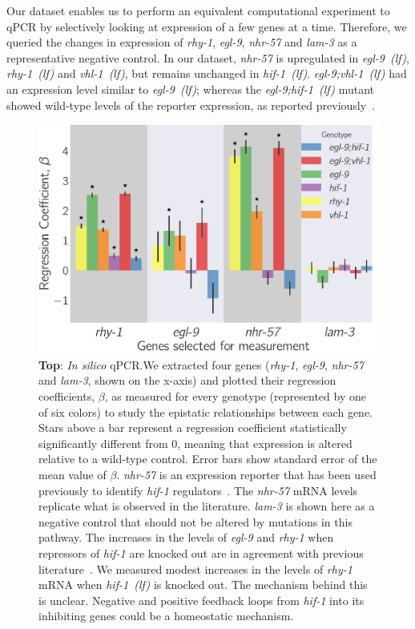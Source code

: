\documentclass[9pt,twocolumn,twoside]{pnas-new}
\newcommand{\gene}[1]{\emph{#1}}
\newcommand{\nhr}{\emph{nhr-57}}
\newcommand{\lam}{\emph{lam-3}}
\newcommand{\egl}{\emph{egl-9~(lf)}}
\newcommand{\rhy}{\emph{rhy-1~(lf)}}
\newcommand{\vhl}{\emph{vhl-1~(lf)}}
\newcommand{\eglvhl}{\emph{egl-9;vhl-1~(lf)}}
\newcommand{\eglhif}{\emph{egl-9;hif-1~(lf)}}
\newcommand{\hif}{\emph{hif-1~(lf)}}
\begin{document}
Our dataset enables us to perform an equivalent computational experiment to qPCR
by selectively looking at expression of a few genes at a time. Therefore, we
queried the changes in expression of \gene{rhy-1}, \gene{egl-9}, \nhr{} and \lam{}
as a representative negative control. In our dataset, \nhr{} is upregulated in
\egl{}, \rhy{} and \vhl{}, but remains unchanged in \hif{}.
\eglvhl{} had an expression level similar to \egl{}; whereas the
\eglhif{} mutant showed wild-type levels of the reporter expression, as reported
previously~\cite{Shen2006}.

\begin{figure}[tbhp]
\centering
\includegraphics[width=\linewidth]{figs/qpcr.pdf}
\caption{
\textbf{Top}: \emph{In silico} qPCR.\@ We extracted
four genes (\gene{rhy-1}, \gene{egl-9}, \nhr{} and \lam{}, shown on the x-axis)
and plotted their regression coefficients, $\beta$, as measured for every
genotype (represented by one of six colors) to study the epistatic relationships
between each gene. Stars above a bar represent a regression coefficient
statistically significantly different from 0, meaning that expression is altered
relative to a wild-type control. Error bars show standard error of the mean
value of $\beta$. \nhr{} is an expression reporter that has been used previously
to identify \gene{hif-1} regulators~\cite{Shen2006,Shao2009}. The \nhr{} mRNA
levels replicate what is observed in the literature. \lam{} is shown here as a
negative control that should not be altered by mutations in this pathway. The
increases in the levels of \gene{egl-9} and \gene{rhy-1} when repressors of
\gene{hif-1} are knocked out are in agreement with previous
literature~\cite{Powell-Coffman2010}. We measured modest increases in the levels
of \gene{rhy-1} mRNA when \hif{} is knocked out. The mechanism behind this is
unclear. Negative and positive feedback loops from \gene{hif-1} into its
inhibiting genes could be a homeostatic mechanism.
}
\label{fig:qpcr}
\end{figure}
\end{document}
